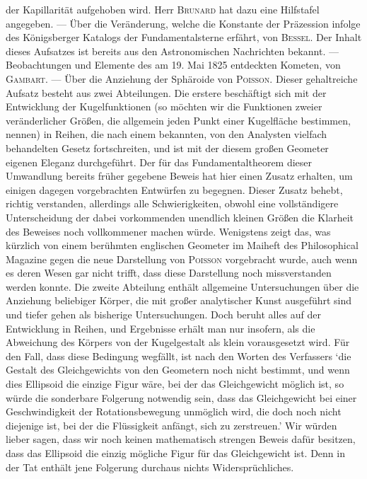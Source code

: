der Kapillarität aufgehoben wird. Herr \textsc{Brunard} hat dazu eine Hilfstafel angegeben. — Über die Veränderung, welche die Konstante der  Präzession infolge des Königsberger Katalogs der Fundamentalsterne erfährt, von \textsc{Bessel}. Der Inhalt dieses Aufsatzes ist bereits aus den Astronomischen Nachrichten bekannt. --- Beobachtungen und Elemente des am 19. Mai 1825 entdeckten Kometen, von \textsc{Gambart}. --- Über die Anziehung der Sphäroide von \textsc{Poisson}. Dieser gehaltreiche Aufsatz besteht aus zwei Abteilungen. Die erstere beschäftigt sich mit der Entwicklung der Kugelfunktionen (so möchten wir die Funktionen zweier veränderlicher Größen, die allgemein jeden Punkt einer Kugelfläche bestimmen, nennen) in Reihen, die nach einem bekannten, von den Analysten vielfach behandelten Gesetz fortschreiten, und ist mit der diesem großen Geometer eigenen Eleganz durchgeführt. Der für das Fundamentaltheorem dieser Umwandlung bereits früher gegebene Beweis hat hier einen Zusatz erhalten, um einigen dagegen vorgebrachten Entwürfen zu begegnen. Dieser Zusatz behebt, richtig verstanden, allerdings alle Schwierigkeiten, obwohl eine vollständigere Unterscheidung der dabei vorkommenden unendlich kleinen Größen die Klarheit des Beweises noch vollkommener machen würde. Wenigstens zeigt das, was kürzlich von einem berühmten englischen Geometer im Maiheft des Philosophical Magazine gegen die neue Darstellung von \textsc{Poisson} vorgebracht wurde, auch wenn es deren Wesen gar nicht trifft, dass diese Darstellung noch missverstanden werden konnte. Die zweite Abteilung enthält allgemeine Untersuchungen über die Anziehung beliebiger Körper, die mit großer analytischer Kunst ausgeführt sind und tiefer gehen als bisherige Untersuchungen. Doch beruht alles auf der Entwicklung in Reihen, und Ergebnisse erhält man nur insofern, als die Abweichung des Körpers von der Kugelgestalt als klein vorausgesetzt wird. Für den Fall, dass diese Bedingung wegfällt, ist nach den Worten des Verfassers ‘die Gestalt des Gleichgewichts von den Geometern noch nicht bestimmt, und wenn dies Ellipsoid die einzige Figur wäre, bei der das Gleichgewicht möglich ist, so würde die sonderbare Folgerung notwendig sein, dass das Gleichgewicht bei einer Geschwindigkeit der Rotationsbewegung unmöglich wird, die doch noch nicht diejenige ist, bei der die Flüssigkeit anfängt, sich zu zerstreuen.’ Wir würden lieber sagen, dass wir noch keinen mathematisch strengen Beweis dafür besitzen, dass das Ellipsoid die einzig mögliche Figur für das Gleichgewicht ist. Denn in der Tat enthält jene Folgerung durchaus nichts Widersprüchliches.
\par\clearpage\endgroup
